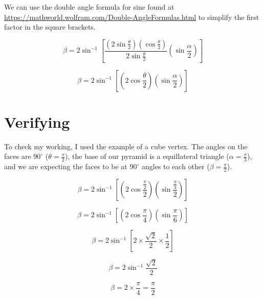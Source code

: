 \documentclass[a4paper]{article}
\begin{document}
  We can use the double angle formula for sine found at \url{https://mathworld.wolfram.com/Double-AngleFormulas.html} to simplify the first factor in the square brackets.

  \begin{equation}
    \beta = 2\sin^{-1}{\left[
      \frac{
        \left(2\sin{\frac{\theta}{2}}\right)
        \left(\cos{\frac{\theta}{2}}\right)
      }{2\sin{\frac{\theta}{2}}}
      \left(\sin{\frac{\alpha}{2}}\right)
    \right]}
  \end{equation}

  \begin{equation}
    \beta = 2\sin^{-1}{\left[
      \left(2\cos{\frac{\theta}{2}}\right)
      \left(\sin{\frac{\alpha}{2}}\right)
    \right]}
  \end{equation}

  \section{Verifying}

  To check my working, I used the example of a cube vertex. The angles on the faces are $90^\circ$ ($\theta = \frac{\pi}{2}$), the base of our pyramid is a equillateral triangle ($\alpha = \frac{\pi}{3}$), and we are expecting the faces to be at $90^\circ$ angles to each other ($\beta = \frac{\pi}{2}$).

  \begin{equation}
    \beta = 2\sin^{-1}{\left[
      \left(2\cos{\frac{\frac{\pi}{2}}{2}}\right)
      \left(\sin{\frac{\frac{\pi}{3}}{2}}\right)
    \right]}
  \end{equation}

  \begin{equation}
    \beta = 2\sin^{-1}{\left[
      \left(2\cos{\frac{\pi}{4}}\right)
      \left(\sin{\frac{\pi}{6}}\right)
    \right]}
  \end{equation}

  \begin{equation}
    \beta = 2\sin^{-1}{\left[
      2 \times
      \frac{\sqrt{2}}{2}
      \times
      \frac{1}{2}
    \right]}
  \end{equation}

  \begin{equation}
    \beta = 2\sin^{-1}{\frac{\sqrt{2}}{2}}
  \end{equation}

  \begin{equation}
    \beta = 2\times\frac{\pi}{4} = \frac{\pi}{2}
  \end{equation}
\end{document}
